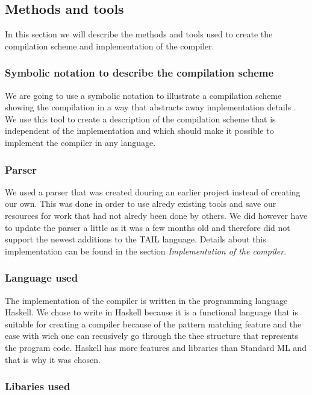 \documentclass[11pt]{article}
\begin{document}
\subsection{Methods and tools}
In this section we will describe the methods and tools used to create the compilation scheme and implementation of the compiler. 

\subsubsection{Symbolic notation to describe the compilation scheme}
We are going to use a symbolic notation to illustrate a compilation scheme showing the compilation in a way
that abstracts away implementation details \cite{MartinElsmanNotation}.
We use this tool to create a description of the compilation scheme that is independent of the implementation and
which should make it possible to implement the compiler in any language.

\subsubsection{Parser}
We used a parser that was created douring an earlier project \cite{APLACC} instead of creating our own.
This was done in order to use alredy existing tools and save our resources for work that had not alredy been done by others.
We did however have to update the parser a little as it was a few months old and therefore did not support the
newest additions to the TAIL language.
Details about this implementation can be found in the section \textit{Implementation of the compiler}. 

\subsubsection{Language used}
The implementation of the compiler is written in the programming language Haskell.
We chose to write in Haskell because it is a functional language that is suitable for creating a compiler because of the 
pattern matching feature and the ease with wich one can recusively go through the thee structure that 
represents the program code. Haskell has more features and libraries than Standard ML and that is why it was chosen. 

\subsubsection{Libaries used}
\end{document}
